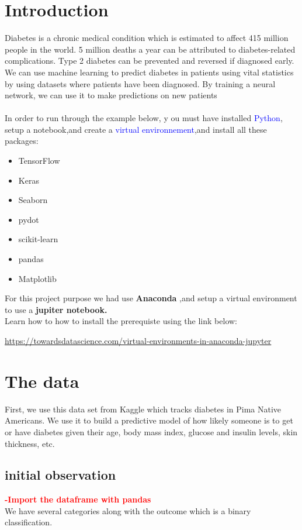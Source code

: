 \section{Introduction}
\label{chap:introduction}


Diabetes is a chronic medical condition which is estimated to affect 415 million people in the world.
 5 million deaths a year can be attributed to diabetes-related complications.
Type 2 diabetes can be prevented and reversed if diagnosed early.
We can use machine learning to predict diabetes in patients using vital 
statistics by using datasets where patients have been diagnosed. By training a neural network,
we can use it to make predictions on new patients
\\
\\
In order to run through the example below, y
ou must have installed \textcolor{blue}{Python},
setup a notebook,and create a  \textcolor{blue}{virtual environnement},and install
  all these packages:


\begin{itemize}
    \item TensorFlow
    \item Keras
    \item Seaborn
    \item pydot
    \item scikit-learn
    \item pandas
    \item Matplotlib
\end{itemize}

For this project purpose we had use 
\textbf{Anaconda },and setup a virtual environment to use a \textbf{jupiter notebook.}
\\
Learn how to how to install the prerequiste using the link below:


\url{https://towardsdatascience.com/virtual-environments-in-anaconda-jupyter}

\section{The data}
\label{chap:data}
First, we use this data set from Kaggle which tracks diabetes in Pima Native Americans.
 We use it to build a predictive model of how likely someone is to get or have diabetes given their age,
  body mass index, glucose and insulin levels, skin thickness, etc.

  \newpage

\subsection{initial observation}
\label{sec:data}
\textcolor{red}{\textbf{-Import the dataframe with pandas}}\\
We have several categories along with the outcome which is a binary classification.

